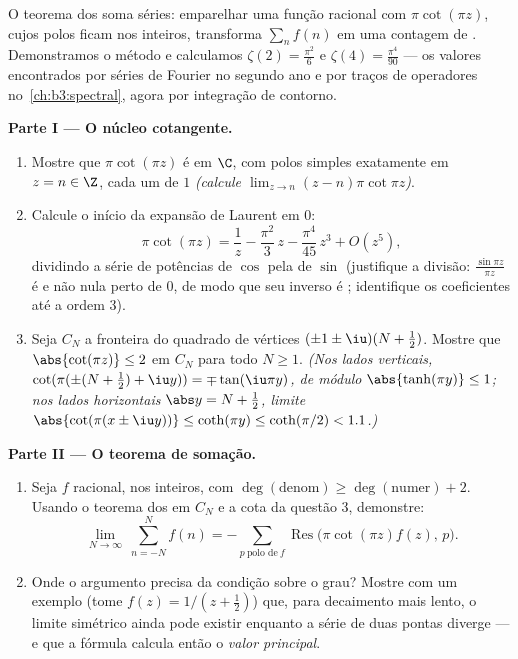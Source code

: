 \begin{problem}\label{pb:b3:residues:1}
O teorema dos  soma séries: emparelhar uma função racional com
$\pi\cot(\pi z)$, cujos polos ficam nos inteiros, transforma $\sum_{n}f(n)$ em uma contagem
de . Demonstramos o método e calculamos $\zeta(2) = \frac{\pi^2}{6}$ e $\zeta(4) =
\frac{\pi^4}{90}$ --- os
valores encontrados por séries de Fourier no segundo ano e por traços de
operadores no~\cref{ch:b3:spectral}, agora por integração de contorno.

\medskip
\noindent\textbf{Parte I --- O núcleo cotangente.}
\begin{enumerate}
  \item Mostre que $\pi\cot(\pi z)$ é  em $\C$, com polos simples
        exatamente em $z = n \in \Z$, cada um de  $1$ \emph{(calcule
        $\lim_{z\to n}(z-n)\pi\cot\pi z$)}.
  \item Calcule o início da expansão de Laurent em $0$:
        \[
        \pi\cot(\pi z) = \frac1z - \frac{\pi^2}{3}\,z -
        \frac{\pi^4}{45}\,z^3 + O(z^5) ,
        \]
        dividindo a série de potências de $\cos$ pela de $\sin$
        (justifique a divisão: $\frac{\sin\pi z}{\pi z}$ é  e não nula perto de
        $0$, de modo que seu inverso é ; identifique os
        coeficientes até a ordem $3$).
  \item Seja $C_N$ a fronteira do quadrado de vértices $(\pm1\pm\iu)(N + \frac12)$. Mostre
        que $\abs{\cot(\pi z)} \leq 2$ em $C_N$ para todo $N \geq
        1$. \emph{(Nos lados
        verticais, $\cot(\pi(\pm(N +
        \frac12) + \iu y)) = \mp\tan(\iu\pi y)$, de módulo $\abs{\tanh(\pi y)} \leq 1$; nos lados horizontais $\abs y = N + \frac12$,
        limite $\abs{\cot(\pi(x\pm\iu y))} \leq \coth(\pi y) \leq
        \coth(\pi/2) < 1.1$.)}
\end{enumerate}

\medskip
\noindent\textbf{Parte II --- O teorema de somação.}
\begin{enumerate}[resume]
  \item Seja $f$ racional,  nos inteiros, com $\deg(\text{denom}) \geq \deg(\text{numer}) + 2$. Usando
        o teorema dos  em $C_N$ e a cota da questão 3,
        demonstre:
        \[
        \lim_{N\to\infty}\ \sum_{n = -N}^{N} f(n)
        = -\sum_{p\ \text{polo de}\ f}
        \operatorname{Res}\bigl(\pi\cot(\pi z)f(z),\,p\bigr).
        \]
  \item Onde o argumento precisa da condição sobre o grau? Mostre com
        um exemplo (tome $f(z) = 1/(z + \frac12)$) que, para decaimento mais lento, o
        limite simétrico ainda pode existir enquanto a série de duas
        pontas diverge --- e que a fórmula calcula então o \emph{valor
        principal}.
\end{enumerate}


\end{problem}
